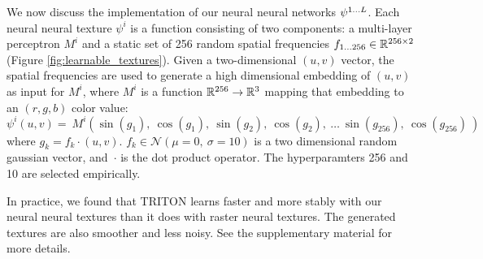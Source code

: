 \documentclass{article}
\begin{document}
		We now discuss the implementation of our neural neural networks $\psi^{1\dots L}$.
		Each neural neural texture $\psi^i$ is a function consisting of two components: a multi-layer perceptron $M^i$ and a static set of 256 random spatial frequencies $f_{1...256} \in \mathbb{R} ^ {256 \times 2}$ (Figure \ref{fig:learnable_textures}). 
		Given a two-dimensional $(u,v)$ vector, the spatial frequencies are used to generate a high dimensional embedding of $(u,v)$ as input for $M^i$, where $M^i$ is a function $\mathbb{R}^{256} \to \mathbb{R}^{3}$ mapping that embedding to an $(r,g,b)$ color value:
		\begin{equation}
				\psi^i(u,v) = 
				\
				M^i(
					\sin( g_1      ) , \ 
					\cos( g_1      ) , \ 
					\sin( g_2      ) , \ 
					\cos( g_2      ) , \ 
					\dots \ 
					\sin( g_{256}  ) , \ 
					\cos( g_{256}  )  \ 
				)
		\end{equation}
		where $g_k=f_k\cdot(u,v)$.
		$f_k \in \mathcal{N}(\mu=0,\ \sigma=10)$ is a two dimensional random gaussian vector,
		\mbox{and $\cdot$} is the dot product operator.
		The hyperparamters 256 and 10 are selected empirically.
		
		
		In practice, we found that TRITON learns faster and more stably with our neural neural textures than it does with raster neural textures. The generated textures are also smoother and less noisy. See the supplementary material for more details.
\end{document}
